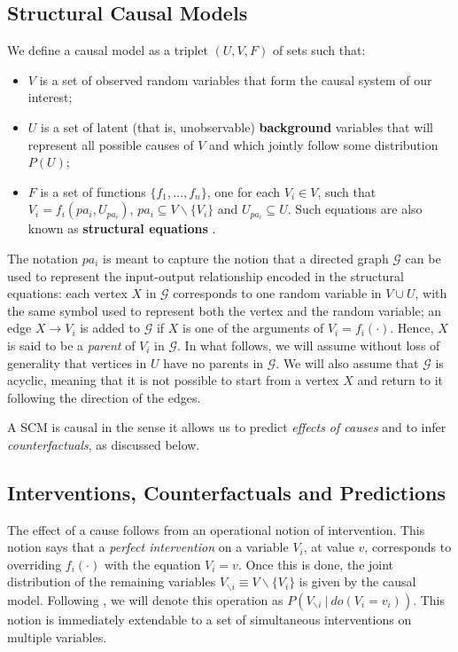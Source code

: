\documentclass{article}
\begin{document}
\subsection{Structural Causal Models}

We define a causal model as a triplet $(U, V, F)$ of sets such that:
%
\begin{itemize}
\item $V$ is a set of observed random variables that form the causal system of our interest;
\item $U$ is a set of latent (that is, unobservable) {\bf background} variables that will
  represent all possible causes of $V$ and which jointly follow some distribution $P(U)$;
\item $F$ is a set of functions $\{f_1, \dots, f_n\}$, one for each
  $V_i \in V$, such that $V_i = f_i(pa_i, U_{pa_i})$, $pa_i \subseteq
  V \backslash \{V_i\}$ and $U_{pa_i} \subseteq U$. Such equations are
  also known as {\bf structural equations} \cite{bol:89}.
\end{itemize}
%
The notation $pa_i$ is meant to capture the notion that a directed
graph $\mathcal G$ can be used to represent the input-output
 relationship encoded in the structural equations: each
vertex $X$ in $\mathcal G$ corresponds to one random variable
in $V \cup U$, with the same symbol used to represent both the vertex
and the random variable; an edge $X \rightarrow V_i$ is added to
$\mathcal G$ if $X$ is one of the arguments of $V_i \!=\! f_i(\cdot)$. Hence,
$X$ is said to be a \emph{parent} of $V_i$ in $\mathcal G$.  In what
follows, we will assume without loss of generality that vertices in
$U$ have no parents in $\mathcal G$. We will also assume that
$\mathcal G$ is acyclic, meaning that it is not possible to start from
a vertex $X$ and return to it following the direction of the edges.

A SCM is causal in the sense it allows us to predict \emph{effects of
  causes} and to infer \emph{counterfactuals}, as discussed below.

\subsection{Interventions, Counterfactuals and Predictions}

The effect of a cause follows from an operational notion of
intervention. This notion says that a \emph{perfect intervention} on a
variable $V_i$, at value $v$, corresponds to overriding $f_i(\cdot)$
with the equation $V_i = v$. Once this is done, the joint
distribution of the remaining variables $V_{\backslash i} \equiv V
\backslash \{V_i\}$ is given by the causal model. Following \cite{pearl:00}, we will
denote this operation as $P(V_{\backslash i}\ |\ do(V_i = v_i))$. This notion is
immediately extendable to a set of simultaneous interventions on multiple
variables.
\end{document}
